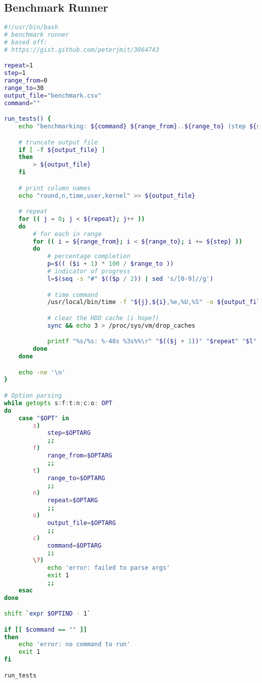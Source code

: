 \subsection{Benchmark Runner}
\label{appendix:benchmark}
\begin{minipage}{\linewidth}
\begin{lstlisting}[language=bash]
#!/usr/bin/bash
# benchmark runner
# based off:
# https://gist.github.com/peterjmit/3864743

repeat=1
step=1
range_from=0
range_to=30
output_file="benchmark.csv"
command=""

run_tests() {
    echo "benchmarking: ${command} ${range_from}..${range_to} (step ${step})"

    # truncate output file
    if [ -f ${output_file} ]
    then
        > ${output_file}
    fi

    # print column names
    echo "round,n,time,user,kernel" >> ${output_file}

    # repeat
    for (( j = 0; j < ${repeat}; j++ ))
    do
        # for each in range
        for (( i = ${range_from}; i < ${range_to}; i += ${step} ))
        do
            # percentage completion
            p=$(( ($i + 1) * 100 / $range_to ))
            # indicator of progress
            l=$(seq -s "#" $(($p / 2)) | sed 's/[0-9]//g')

            # time command
            /usr/local/bin/time -f "${j},${i},%e,%U,%S" -o ${output_file} -a ${command} ${i} > /dev/null

            # clear the HDD cache (i hope?)
            sync && echo 3 > /proc/sys/vm/drop_caches

            printf "%s/%s: %-48s %3s%%\r" "$(($j + 1))" "$repeat" "$l" "$p"
        done
    done

    echo -ne '\n'
}

# Option parsing
while getopts s:f:t:n:c:o: OPT
do
    case "$OPT" in
        s)
            step=$OPTARG
            ;;
        f)
            range_from=$OPTARG
            ;;
        t)
            range_to=$OPTARG
            ;;
        n)
            repeat=$OPTARG
            ;;
        o)
            output_file=$OPTARG
            ;;
        c)
            command=$OPTARG
            ;;
        \?)
            echo 'error: failed to parse args'
            exit 1
            ;;
    esac
done

shift `expr $OPTIND - 1`

if [[ $command == "" ]]
then
    echo 'error: no command to run'
    exit 1
fi

run_tests
\end{lstlisting}
\end{minipage}

